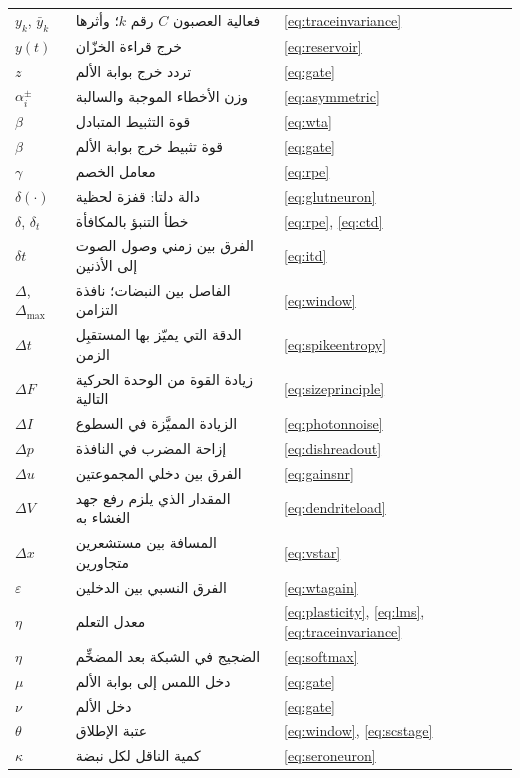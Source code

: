 \begin{center}
\begin{longtable}{>{\raggedright}p{2.0cm}>{\raggedright}p{9.6cm}>{\raggedright\arraybackslash}p{2.4cm}}
$y_k$, $\bar y_k$ & فعالية العصبون $C$ رقم $k$؛ وأثرها & \eqref{eq:traceinvariance} \\
$y(t)$ & خرج قراءة الخزّان & \eqref{eq:reservoir} \\
$z$ & تردد خرج بوابة الألم & \eqref{eq:gate} \\
\midrule
$\alpha_i^\pm$ & وزن الأخطاء الموجبة والسالبة & \eqref{eq:asymmetric} \\
$\beta$ & قوة التثبيط المتبادل & \eqref{eq:wta} \\
$\beta$ & قوة تثبيط خرج بوابة الألم & \eqref{eq:gate} \\
$\gamma$ & معامل الخصم & \eqref{eq:rpe} \\
$\delta(\cdot)$ & دالة دلتا: قفزة لحظية & \eqref{eq:glutneuron} \\
$\delta$, $\delta_t$ & خطأ التنبؤ بالمكافأة & \eqref{eq:rpe}, \eqref{eq:ctd} \\
$\delta t$ & الفرق بين زمني وصول الصوت إلى الأذنين & \eqref{eq:itd} \\
$\Delta$, $\Delta_{\max}$ & الفاصل بين النبضات؛ نافذة التزامن & \eqref{eq:window} \\
$\Delta t$ & الدقة التي يميّز بها المستقبِل الزمن & \eqref{eq:spikeentropy} \\
$\Delta F$ & زيادة القوة من الوحدة الحركية التالية & \eqref{eq:sizeprinciple} \\
$\Delta I$ & الزيادة المميَّزة في السطوع & \eqref{eq:photonnoise} \\
$\Delta p$ & إزاحة المضرب في النافذة & \eqref{eq:dishreadout} \\
$\Delta u$ & الفرق بين دخلي المجموعتين & \eqref{eq:gainsnr} \\
$\Delta V$ & المقدار الذي يلزم رفع جهد الغشاء به & \eqref{eq:dendriteload} \\
$\Delta x$ & المسافة بين مستشعرين متجاورين & \eqref{eq:vstar} \\
$\varepsilon$ & الفرق النسبي بين الدخلين & \eqref{eq:wtagain} \\
$\eta$ & معدل التعلم & \eqref{eq:plasticity}, \eqref{eq:lms}, \eqref{eq:traceinvariance} \\
$\eta$ & الضجيج في الشبكة بعد المضخِّم & \eqref{eq:softmax} \\
$\mu$ & دخل اللمس إلى بوابة الألم & \eqref{eq:gate} \\
$\nu$ & دخل الألم & \eqref{eq:gate} \\
$\theta$ & عتبة الإطلاق & \eqref{eq:window}, \eqref{eq:scstage} \\
$\kappa$ & كمية الناقل لكل نبضة & \eqref{eq:seroneuron} \\

\end{longtable}
\end{center}
